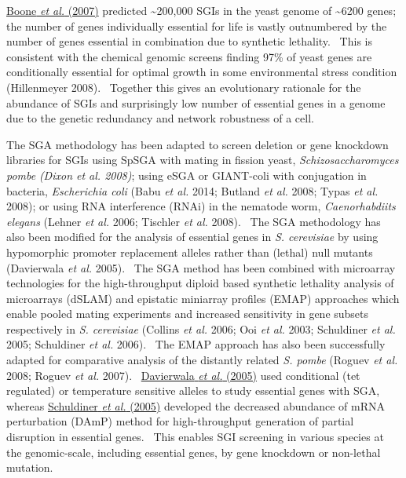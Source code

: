 \hyperlink{ENREF15}{Boone}\hyperlink{ENREF15}{\textit{ et al.}}\hyperlink{ENREF15}{ (2007)} predicted \~{}200,000 SGIs in the yeast genome of \~{}6200 genes; the number of genes individually essential for life is vastly outnumbered by the number of genes essential in combination due to synthetic lethality. \ This is consistent with the chemical genomic screens finding 97\% of yeast genes are conditionally essential for optimal growth in some environmental stress condition (Hillenmeyer 2008). \ Together this gives an evolutionary rationale for the abundance of SGIs and surprisingly low number of essential genes in a genome due to the genetic redundancy and network robustness of a cell. \  

The SGA methodology has been adapted to screen deletion or gene knockdown libraries for SGIs using SpSGA with mating in fission yeast, \textit{Schizosaccharomyces pombe }\textit{(Dixon et al. 2008)}; using eSGA or GIANT-coli with conjugation in bacteria, \textit{Escherichia coli} (Babu\textit{ et al.} 2014; Butland\textit{ et al.} 2008; Typas\textit{ et al.} 2008); or using RNA interference (RNAi) in the nematode worm, \textit{Caenorhabdiits elegans} (Lehner\textit{ et al.} 2006; Tischler\textit{ et al.} 2008). \ The SGA methodology has also been modified for the analysis of essential genes in \textit{S. cerevisiae} by using hypomorphic promoter replacement alleles rather than (lethal) null mutants (Davierwala\textit{ et al.} 2005). \ The SGA method has been combined with microarray technologies for the high-throughput diploid based synthetic lethality analysis of microarrays (dSLAM) and epistatic miniarray profiles (EMAP) approaches which enable pooled mating experiments and increased sensitivity in gene subsets respectively in \textit{S. cerevisiae} (Collins\textit{ et al.} 2006; Ooi\textit{ et al.} 2003; Schuldiner\textit{ et al.} 2005; Schuldiner\textit{ et al.} 2006). \ The EMAP approach has also been successfully adapted for comparative analysis of the distantly related \textit{S. pombe} (Roguev\textit{ et al.} 2008; Roguev\textit{ et al.} 2007). \ \hyperlink{ENREF28}{Davierwala}\hyperlink{ENREF28}{\textit{ et al.}}\hyperlink{ENREF28}{ (2005)} used conditional (tet regulated) or temperature sensitive alleles to study essential genes with SGA, whereas \hyperlink{ENREF87}{Schuldiner}\hyperlink{ENREF87}{\textit{ et al.}}\hyperlink{ENREF87}{ (2005)} developed the decreased abundance of mRNA perturbation (DAmP) method for high-throughput generation of partial disruption in essential genes. \ This enables SGI screening in various species at the genomic-scale, including essential genes, by gene knockdown or non-lethal mutation. \  

